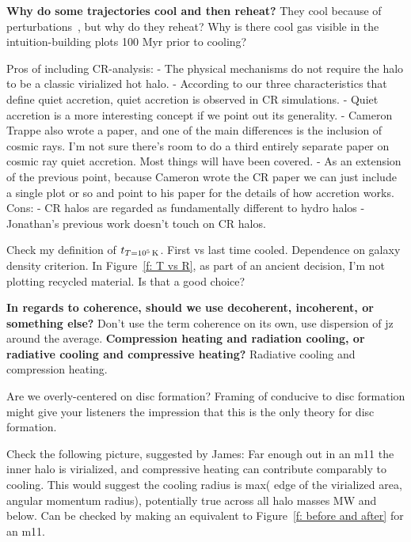 \documentclass[fleqn,usenatbib]{mnras}
\newcommand{\tcon}{t_{T=10^5\,{\rm K}}}
\begin{document}
\textbf{Why do some trajectories cool and then reheat?}
They cool because of perturbations~\citep{Esmerian2020}, but why do they reheat?
Why is there cool gas visible in the intuition-building plots 100 Myr prior to cooling?

Pros of including CR-analysis:
- The physical mechanisms do not require the halo to be a classic virialized hot halo.
- According to our three characteristics that define quiet accretion, quiet accretion is observed in CR simulations.
- Quiet accretion is a more interesting concept if we point out its generality.
- Cameron Trappe also wrote a paper, and one of the main differences is the inclusion of cosmic rays. I'm not sure there's room to do a third entirely separate paper on cosmic ray quiet accretion. Most things will have been covered.
- As an extension of the previous point, because Cameron wrote the CR paper we can just include a single plot or so and point to his paper for the details of how accretion works.
Cons:
- CR halos are regarded as fundamentally different to hydro halos
- Jonathan's previous work doesn't touch on CR halos.

Check my definition of $\tcon$.
First vs last time cooled.
Dependence on galaxy density criterion.
In Figure~\ref{f: T vs R}, as part of an ancient decision, I'm not plotting recycled material.
Is that a good choice?

\textbf{In regards to coherence, should we use decoherent, incoherent, or something else?}
Don't use the term coherence on its own, use dispersion of jz around the average.
\textbf{Compression heating and radiation cooling, or radiative cooling and compressive heating?}
Radiative cooling and compression heating.

Are we overly-centered on disc formation?
Framing of conducive to disc formation might give your listeners the impression that this is the only theory for disc formation.

Check the following picture, suggested by James:
Far enough out in an m11 the inner halo is virialized, and compressive heating can contribute comparably to cooling.
This would suggest the cooling radius is max( edge of the virialized area, angular momentum radius), potentially true across all halo masses MW and below.
Can be checked by making an equivalent to Figure~\ref{f: before and after} for an m11.
\end{document}
